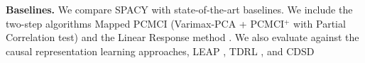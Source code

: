 \textbf{Baselines.} We compare SPACY with state-of-the-art baselines. We include the two-step algorithms Mapped PCMCI (Varimax-PCA + PCMCI$^+$ with Partial Correlation test) \citep{xavi2022teleconnection, runge2020pcmci+} and the Linear Response method \citep{Falasca_2024}. We also evaluate against the causal representation learning approaches, LEAP \citep{yao2021learning}, TDRL \citep{yao2022temporally}, and CDSD \citep{boussard2023towards,brouillard2024causal}




